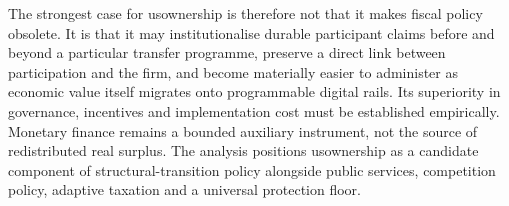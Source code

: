 The strongest case for usownership is therefore not that it makes fiscal policy obsolete. It is that it may institutionalise durable participant claims before and beyond a particular transfer programme, preserve a direct link between participation and the firm, and become materially easier to administer as economic value itself migrates onto programmable digital rails. Its superiority in governance, incentives and implementation cost must be established empirically. Monetary finance remains a bounded auxiliary instrument, not the source of redistributed real surplus. The analysis positions usownership as a candidate component of structural-transition policy alongside public services, competition policy, adaptive taxation and a universal protection floor.

